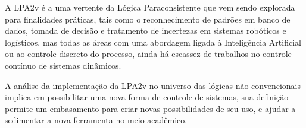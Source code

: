 A LPA2v é a uma vertente da Lógica Paraconsistente que vem sendo explorada para finalidades práticas, 
tais como o reconhecimento de padrões em banco de dados, tomada de decisão e tratamento de incertezas em sistemas robóticos e logísticos, 
mas todas as áreas com uma abordagem ligada à Inteligência Artificial ou ao controle discreto do processo, 
ainda há escassez de trabalhos no controle contínuo de sistemas dinâmicos. 


A análise da implementação da LPA2v no universo das lógicas não-convencionais implica em possibilitar uma nova forma de controle de sistemas, 
sua definição permite um embasamento para criar novas possibilidades de seu uso,
e ajudar a sedimentar a nova ferramenta no meio acadêmico. 









